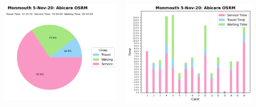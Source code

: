 \documentclass[usenames,dvipsnames]{beamer}
\begin{document}
\begin{frame} %
	\begin{columns}
		\begin{minipage}[c][0.45\textheight][c]{\linewidth}
			\centering
			\includegraphics[width=1\linewidth]{figures/5_Nov_20_Monmouth_time_info_abiosrm}
		\end{minipage}
		\begin{minipage}[c][0.45\textheight][c]{\linewidth}
			\vspace{5mm}
			\centering
			\includegraphics[width=1\linewidth]{figures/5_Nov_20_Monmouth_workload_abiosrm}

\end{minipage}
\end{columns}
\end{frame}
\end{document}
